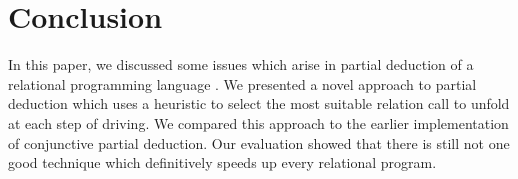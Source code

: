 \section{Conclusion}

In this paper, we discussed some issues which arise in partial deduction of a relational programming language \mk{}.
We presented a novel approach to partial deduction which uses a heuristic to select the most suitable relation call to unfold at each step of driving.
We compared this approach to the earlier implementation of conjunctive partial deduction.
Our evaluation showed that there is still not one good technique which definitively speeds up every relational program.
